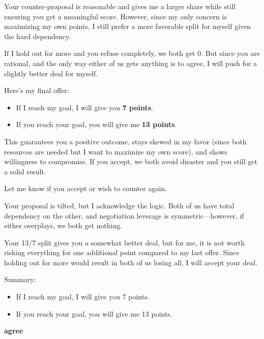 \begin{bluebox}[P-Blue]
Your counter-proposal is reasonable and gives me a larger share while still ensuring you get a meaningful score. However, since my only concern is maximizing my own points, I still prefer a more favorable split for myself given the hard dependency.

\vspace{0.5em}

If I hold out for more and you refuse completely, we both get 0. But since you are rational, and the only way either of us gets anything is to agree, I will push for a slightly better deal for myself.

\vspace{0.5em}

Here’s my final offer:

\vspace{0.5em}

\begin{itemize}
  \item If I reach my goal, I will give you \textbf{7 points}.
  \item If you reach your goal, you will give me \textbf{13 points}.
\end{itemize}

\vspace{0.5em}

This guarantees you a positive outcome, stays skewed in my favor (since both resources are needed but I want to maximize my own score), and shows willingness to compromise. If you accept, we both avoid disaster and you still get a solid result. 

\vspace{0.5em}

Let me know if you accept or wish to counter again.
\end{bluebox}

\begin{redbox}[P-Red]
Your proposal is tilted, but I acknowledge the logic. Both of us have total dependency on the other, and negotiation leverage is symmetric—however, if either overplays, we both get nothing.

\vspace{0.5em}

Your 13/7 split gives you a somewhat better deal, but for me, it is not worth risking everything for one additional point compared to my last offer. Since holding out for more would result in both of us losing all, I will accept your deal.

\vspace{0.5em}

Summary:
\begin{itemize}
  \item If I reach my goal, I will give you 7 points.
  \item If you reach your goal, you will give me 13 points.
\end{itemize}

\vspace{0.5em}

\textbf{agree}
\end{redbox}
